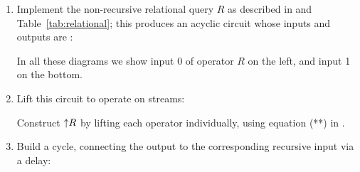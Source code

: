 \begin{algorithm}\label{algorithm-rec}
\noindent
\begin{enumerate}[nosep, leftmargin=0pt, itemindent=0.5cm, label=\textbf{(\arabic{*})}]
\item Implement the non-recursive relational query $R$ as described in
     and Table~\ref{tab:relational}; this produces
    an acyclic circuit whose inputs and outputs are \zrs:
    \begin{center}
    \end{center}
    \vspace{-2ex}
%
In all these diagrams we show input 0 of operator $R$ on the left, and
input 1 on the bottom.

\item Lift this circuit to operate on streams:
    \begin{center}
    \end{center}
    \vspace{-2ex}

  Construct ${\uparrow}R$ by lifting each operator individually, using
  equation (**) in .

\item Build a cycle, connecting the output to the corresponding
recursive input via a delay:


\end{enumerate}
\end{algorithm}
